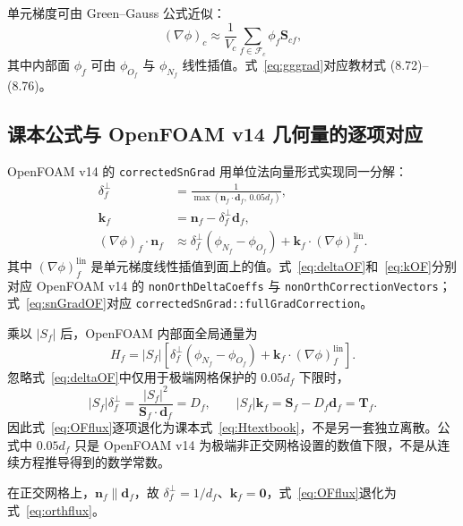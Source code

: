 \documentclass[UTF8,a4paper,11pt]{ctexart}
\newcommand{\vect}[1]{\bm{#1}}
\newcommand{\Sf}{\vect S_f}
\newcommand{\Scf}{\vect S_{cf}}
\newcommand{\df}{\vect d_f}
\newcommand{\nf}{\vect n_f}
\newcommand{\kf}{\vect k_f}
\begin{document}
单元梯度可由 Green--Gauss 公式近似：
\begin{equation}
  (\nabla\phi)_c
  \approx\frac{1}{V_c}
  \sum_{f\in\mathcal F_c}\phi_f\Scf,
  \label{eq:gggrad}
\end{equation}
其中内部面 \(\phi_f\) 可由 \(\phi_{O_f}\) 与 \(\phi_{N_f}\) 线性插值。式~\eqref{eq:gggrad}对应教材式 (8.72)--(8.76)\cite{Moukalled2016}。

\subsection{课本公式与 OpenFOAM v14 几何量的逐项对应}

OpenFOAM v14 的 \texttt{correctedSnGrad} 用单位法向量形式实现同一分解：
\begin{align}
  \delta_f^{\perp}
  &=\frac{1}{\max\!\left(\nf\cdot\df,\,0.05d_f\right)},
  \label{eq:deltaOF}\\
  \kf&=\nf-\delta_f^{\perp}\df,
  \label{eq:kOF}\\
  (\nabla\phi)_f\cdot\nf
  &\approx \delta_f^{\perp}
  (\phi_{N_f}-\phi_{O_f})
  +\kf\cdot(\nabla\phi)_f^{\mathrm{lin}}.
  \label{eq:snGradOF}
\end{align}
其中 \((\nabla\phi)_f^{\mathrm{lin}}\) 是单元梯度线性插值到面上的值。式~\eqref{eq:deltaOF}和~\eqref{eq:kOF}分别对应 OpenFOAM v14 的
\texttt{nonOrthDelta\allowbreak Coeffs} 与
\texttt{nonOrthCorrection\allowbreak Vectors}\cite{OFsurface}；式~\eqref{eq:snGradOF}对应
\texttt{correctedSnGrad::\allowbreak fullGradCorrection}\cite{OFcorrected}。

乘以 \(|S_f|\) 后，OpenFOAM 内部面全局通量为
\begin{equation}
  \boxed{
  H_f=|S_f|\left[
  \delta_f^{\perp}(\phi_{N_f}-\phi_{O_f})
  +\kf\cdot(\nabla\phi)_f^{\mathrm{lin}}
  \right].}
  \label{eq:OFflux}
\end{equation}
忽略式~\eqref{eq:deltaOF}中仅用于极端网格保护的 \(0.05d_f\) 下限时，
\begin{equation}
  |S_f|\delta_f^{\perp}
  =\frac{|S_f|^2}{\Sf\cdot\df}
  =D_f,
  \qquad
  |S_f|\kf=\Sf-D_f\df=\vect T_f.
  \label{eq:equivalence}
\end{equation}
因此式~\eqref{eq:OFflux}逐项退化为课本式~\eqref{eq:Htextbook}，不是另一套独立离散。公式中 \(0.05d_f\) 只是 OpenFOAM v14 为极端非正交网格设置的数值下限，不是从连续方程推导得到的数学常数\cite{OFsurface}。

在正交网格上，\(\nf\parallel\df\)，故
\(\delta_f^{\perp}=1/d_f\)、\(\kf=\vect0\)，式~\eqref{eq:OFflux}退化为式~\eqref{eq:orthflux}。
\end{document}
